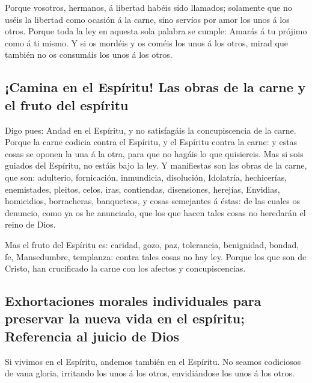  Porque vosotros, hermanos, á libertad habéis sido
llamados; solamente que no uséis la libertad como ocasión á la carne,
sino servíos por amor los unos á los otros.  Porque toda la
ley en aquesta sola palabra se cumple: Amarás á tu prójimo como á ti
mismo.  Y si os mordéis y os coméis los unos á los otros,
mirad que también no os consumáis los unos á los otros.

\hypertarget{camina-en-el-espuxedritu-las-obras-de-la-carne-y-el-fruto-del-espuxedritu}{%
\subsection{¡Camina en el Espíritu! Las obras de la carne y el fruto del
espíritu}\label{camina-en-el-espuxedritu-las-obras-de-la-carne-y-el-fruto-del-espuxedritu}}

 Digo pues: Andad en el Espíritu, y no satisfagáis la
concupiscencia de la carne.  Porque la carne codicia contra
el Espíritu, y el Espíritu contra la carne: y estas cosas se oponen la
una á la otra, para que no hagáis lo que quisiereis.  Mas
si sois guiados del Espíritu, no estáis bajo la ley.  Y
manifiestas son las obras de la carne, que son: adulterio, fornicación,
inmundicia, disolución,  Idolatría, hechicerías,
enemistades, pleitos, celos, iras, contiendas, disensiones, herejías,
 Envidias, homicidios, borracheras, banqueteos, y cosas
semejantes á éstas: de las cuales os denuncio, como ya os he anunciado,
que los que hacen tales cosas no heredarán el reino de Dios.

 Mas el fruto del Espíritu es: caridad, gozo, paz,
tolerancia, benignidad, bondad, fe,  Mansedumbre,
templanza: contra tales cosas no hay ley.  Porque los que
son de Cristo, han crucificado la carne con los afectos y
concupiscencias.

\hypertarget{exhortaciones-morales-individuales-para-preservar-la-nueva-vida-en-el-espuxedritu-referencia-al-juicio-de-dios}{%
\subsection{Exhortaciones morales individuales para preservar la nueva
vida en el espíritu; Referencia al juicio de
Dios}\label{exhortaciones-morales-individuales-para-preservar-la-nueva-vida-en-el-espuxedritu-referencia-al-juicio-de-dios}}

 Si vivimos en el Espíritu, andemos también en el Espíritu.
 No seamos codiciosos de vana gloria, irritando los unos á
los otros, envidiándose los unos á los otros.

